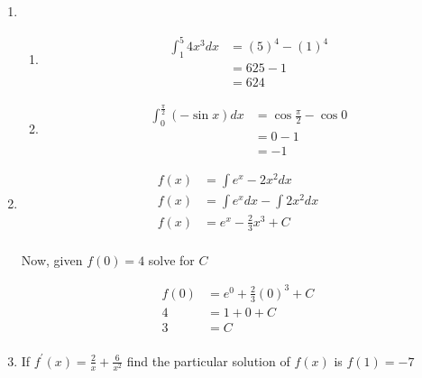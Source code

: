 \documentclass[11pt]{article}
\begin{document}
	\begin{enumerate}[{\bf Q1.}] 
	
	\item

  	\begin{enumerate}
		\item

		\[
            \begin{aligned}
                \int_1^5 4x^3 dx &= (5)^4 - (1)^4\\
                &= 625 - 1\\
                & = 624
            \end{aligned}    
        \]
		

        \item 

        \[
            \begin{aligned}
                \int_0^{\frac{\pi}{2}} (-\sin x)dx &= \cos\frac{\pi}{2} - \cos 0\\
                &= 0 - 1 \\
                &= -1  
            \end{aligned}   
        \]

		
	\end{enumerate}
	
	
	\newpage

    \item
    
    \[
        \begin{aligned}
            f(x) &= \int e^x - 2x^2 dx \\
            f(x) &= \int e^x dx  - \int 2x^2 dx\\
            f(x) &= e^x - \frac{2}{3}x^3 + C \\
        \end{aligned}    
    \]

    Now, given $f(0) = 4$ solve for $C$

    \[
        \begin{aligned}
            f(0) &= e^0 + \frac{2}{3}(0)^3 + C\\
            4 &= 1 + 0 + C \\
            3 &= C\\
        \end{aligned}
    \]

    \item If $f^{\prime}(x) = \frac{2}{x} + \frac{6}{x^2}$ find the particular solution of $f(x)$ is $f(1) = -7$


\end{enumerate}
\end{document}
